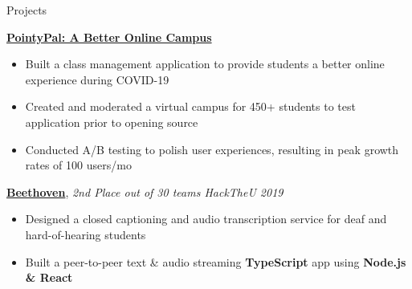 \documentclass{resume/resume}
\begin{document}
%
%
%
\begin{rSection}{Projects}

    \href{https://github.com/UtahTriangle/pointypal}{\bf PointyPal: A Better Online Campus}
    \vspace{-6pt}
    \begin{itemize}[nosep]
        \item Built a class management application to provide students a better online experience during COVID-19
        \item Created and moderated a virtual campus for 450+ students to test application prior to opening source 
        \item Conducted A/B testing to polish user experiences, resulting in peak growth rates of 100 users/mo
    \end{itemize}

    
    \href{https://devpost.com/software/beethoven-t9ud86}{\bf Beethoven}, {\em 2nd Place out of 30 teams
    \hfill HackTheU 2019}
    \vspace{-6pt}
    \begin{itemize}[nosep]
        \item Designed a closed captioning and audio transcription service for deaf and hard-of-hearing students
        \item Built a peer-to-peer text \& audio streaming {\bf TypeScript} app using {\bf Node.js \& React}
    \end{itemize}
    

\end{rSection}
\end{document}
